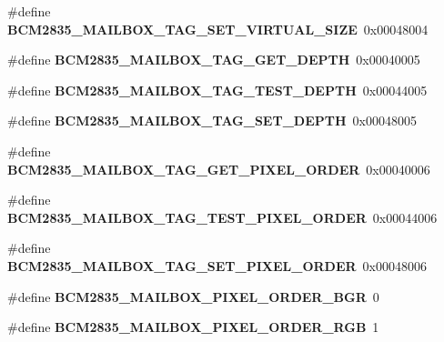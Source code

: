 \begin{DoxyCompactItemize}
\#define {\bfseries B\+C\+M2835\+\_\+\+M\+A\+I\+L\+B\+O\+X\+\_\+\+T\+A\+G\+\_\+\+S\+E\+T\+\_\+\+V\+I\+R\+T\+U\+A\+L\+\_\+\+S\+I\+ZE}~0x00048004
\item 
\mbox{\label{group__raspberrypi__vc_gaa12ab959fdfdc108ffd8fab727434e9e}} 
\#define {\bfseries B\+C\+M2835\+\_\+\+M\+A\+I\+L\+B\+O\+X\+\_\+\+T\+A\+G\+\_\+\+G\+E\+T\+\_\+\+D\+E\+P\+TH}~0x00040005
\item 
\mbox{\label{group__raspberrypi__vc_gaee2f37e92c333a377b0f7d1644205041}} 
\#define {\bfseries B\+C\+M2835\+\_\+\+M\+A\+I\+L\+B\+O\+X\+\_\+\+T\+A\+G\+\_\+\+T\+E\+S\+T\+\_\+\+D\+E\+P\+TH}~0x00044005
\item 
\mbox{\label{group__raspberrypi__vc_gaaf15f9ddc4eb99f816df8b8329e5ac9e}} 
\#define {\bfseries B\+C\+M2835\+\_\+\+M\+A\+I\+L\+B\+O\+X\+\_\+\+T\+A\+G\+\_\+\+S\+E\+T\+\_\+\+D\+E\+P\+TH}~0x00048005
\item 
\mbox{\label{group__raspberrypi__vc_ga5674cd728c95ff363ce9b8df1c40f6dd}} 
\#define {\bfseries B\+C\+M2835\+\_\+\+M\+A\+I\+L\+B\+O\+X\+\_\+\+T\+A\+G\+\_\+\+G\+E\+T\+\_\+\+P\+I\+X\+E\+L\+\_\+\+O\+R\+D\+ER}~0x00040006
\item 
\mbox{\label{group__raspberrypi__vc_ga87362d4249b1061839b8493dc5718b87}} 
\#define {\bfseries B\+C\+M2835\+\_\+\+M\+A\+I\+L\+B\+O\+X\+\_\+\+T\+A\+G\+\_\+\+T\+E\+S\+T\+\_\+\+P\+I\+X\+E\+L\+\_\+\+O\+R\+D\+ER}~0x00044006
\item 
\mbox{\label{group__raspberrypi__vc_ga3ee28195b51acccac918af1591fb8b3f}} 
\#define {\bfseries B\+C\+M2835\+\_\+\+M\+A\+I\+L\+B\+O\+X\+\_\+\+T\+A\+G\+\_\+\+S\+E\+T\+\_\+\+P\+I\+X\+E\+L\+\_\+\+O\+R\+D\+ER}~0x00048006
\item 
\mbox{\label{group__raspberrypi__vc_ga66391bd15eafeb8c47cd1d3db9f8a1ce}} 
\#define {\bfseries B\+C\+M2835\+\_\+\+M\+A\+I\+L\+B\+O\+X\+\_\+\+P\+I\+X\+E\+L\+\_\+\+O\+R\+D\+E\+R\+\_\+\+B\+GR}~0
\item 
\mbox{\label{group__raspberrypi__vc_ga664442dc932570cfffda7ffd3a27444c}} 
\#define {\bfseries B\+C\+M2835\+\_\+\+M\+A\+I\+L\+B\+O\+X\+\_\+\+P\+I\+X\+E\+L\+\_\+\+O\+R\+D\+E\+R\+\_\+\+R\+GB}~1

\end{DoxyCompactItemize}
